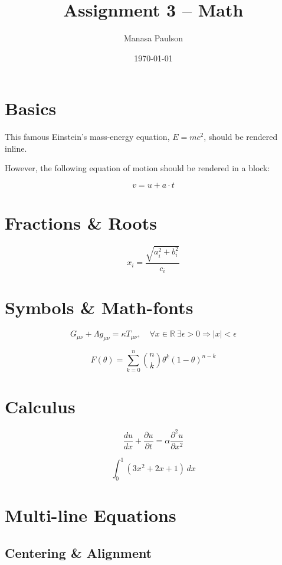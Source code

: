 \documentclass[a4paper,12pt]{article}
\begin{document}
	
	\title{Assignment 3 -- Math}
	\author{Manasa Paulson}
	\date{\today}
	
	\maketitle
	
	\section{Basics}
	
	This famous Einstein's mass-energy equation,
	\(E = mc^2\), should be rendered inline.
	
	However, the following equation of motion should be
	rendered in a block:
	
	\[
	v = u + a \cdot t
	\]
	
	\section{Fractions \& Roots}
	
	\[
	x_i = \frac{\sqrt{a_i^2 + b_i^2}}{c_i}
	\]
	
	\section{Symbols \& Math-fonts}
	
	\[
	G_{\mu\nu} + \Lambda g_{\mu\nu} = \kappa T_{\mu\nu},
	\quad \forall x \in \mathbb{R}\ \exists \epsilon > 0
	\Rightarrow |x| < \epsilon
	\]
	
	\[
	F(\theta) =
	\sum_{k=0}^{n}
	\binom{n}{k}
	\theta^k (1-\theta)^{n-k}
	\]
	
	\section{Calculus}
	
	\[
	\frac{du}{dx} + \frac{\partial u}{\partial t}
	= \alpha \frac{\partial^2 u}{\partial x^2}
	\]
	
	\[
	\int_0^1 (3x^2 + 2x + 1)\,dx
	\]
	
	\section{Multi-line Equations}
	
	\subsection{Centering \& Alignment}
	
\end{document}
